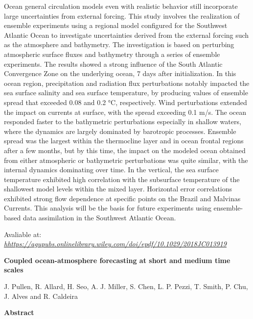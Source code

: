\noindent Ocean general circulation models even with realistic behavior still incorporate large uncertainties from external forcing. This study involves the realization of ensemble experiments using a 
          regional model configured for the Southwest Atlantic Ocean to investigate uncertainties derived from the external forcing such as the atmosphere and bathymetry. The investigation is based on
          perturbing atmospheric surface fluxes and bathymetry through a series of ensemble experiments. The results showed a strong influence of the South Atlantic Convergence Zone on the underlying ocean, 
          7 days after initialization. In this ocean region, precipitation and radiation flux perturbations notably impacted the sea surface salinity and sea surface temperature, by producing values of 
          ensemble spread that exceeded 0.08 and 0.2 °C, respectively. Wind perturbations extended the impact on currents at surface, with the spread exceeding 0.1 m/s. The ocean responded faster to 
          the bathymetric perturbations especially in shallow waters, where the dynamics are largely dominated by barotropic processes. Ensemble spread was the largest within the thermocline layer and in
          ocean frontal regions after a few months, but by this time, the impact on the modeled ocean obtained from either atmospheric or bathymetric perturbations was quite similar, with the internal 
          dynamics dominating over time. In the vertical, the sea surface temperature exhibited high correlation with the subsurface temperature of the shallowest model levels within the mixed layer.
          Horizontal error correlations exhibited strong flow dependence at specific points on the Brazil and Malvinas Currents. This analysis will be the basis for future experiments using ensemble-based 
          data assimilation in the Southwest Atlantic Ocean.
\bigskip

\noindent \textcolor{black}{}
\bigskip

\noindent Avaliable at: \textcolor{bleu_cite}{\href{https://agupubs.onlinelibrary.wiley.com/doi/epdf/10.1029/2018JC013919}{\textit{hhttps://agupubs.onlinelibrary.wiley.com/doi/epdf/10.1029/2018JC013919}}}
\bigskip

\newpage
\noindent \begin{center}
\textbf{Coupled ocean-atmosphere forecasting at short and medium time scales}
\bigskip

\noindent J. Pullen, R. Allard, H. Seo, A. J. Miller, S. Chen, L. P. Pezzi, T. Smith, P. Chu, J. Alves and R. Caldeira
\bigskip

\noindent \textbf{Abstract}\end{center}
\bigskip

